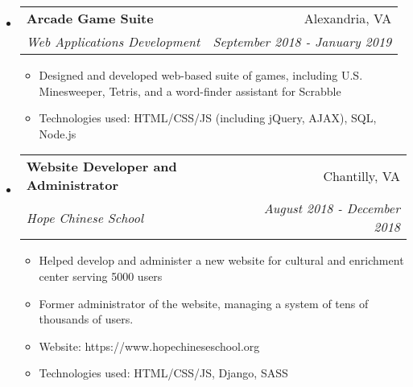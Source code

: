 \documentclass[letterpaper,10pt]{article}
\makeatletter
\newcommand{\resitem}[1]{\item #1 \vspace{-2pt}}
\newcommand{\ressubheading}[4]{
\begin{tabular*}{7.0in}{l@{\extracolsep{\fill}}r}
		\textbf{#1} & #2 \\
		\textit{#3} & \textit{#4} \\
\end{tabular*}\vspace{-6pt}}
\makeatother
\begin{document}
\begin{itemize}
\item
    \ressubheading{Arcade Game Suite}{Alexandria, VA}{Web Applications Development}{September 2018 - January 2019}
	\begin{itemize}
		\resitem{Designed and developed web-based suite of games, including U.S. Minesweeper, Tetris, and a word-finder assistant for Scrabble}
		\resitem{Technologies used: HTML/CSS/JS (including jQuery, AJAX), SQL, Node.js}
	\end{itemize}
\item
    \ressubheading{Website Developer and Administrator}{Chantilly, VA}{Hope Chinese School}{August 2018 - December 2018}
	\begin{itemize}
	    \resitem{Helped develop and administer a new website for cultural and enrichment center serving 5000 users}
		\resitem{Former administrator of the website, managing a system of tens of thousands of users.}
		\resitem{Website: https://www.hopechineseschool.org}
		\resitem{Technologies used: HTML/CSS/JS, Django, SASS}
	\end{itemize}

\end{itemize}
\end{document}
